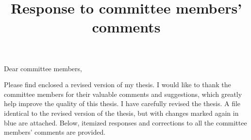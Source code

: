 \documentclass[aps,prl,reprint,showpacs,floatfix,superscriptaddress, onecolumn, 12pt]{revtex4-2}
\begin{document}

\title{Response to committee members' comments}
\author{}

\maketitle

\noindent Dear committee members,

Please find enclosed a revised version of my thesis. I would like to thank the committee members for their valuable comments and suggestions, which greatly help improve the quality of this thesis. I have carefully revised the thesis. A file identical to the revised version of the thesis, but with changes marked again in blue are attached. Below, itemized responses and corrections to all the committee members' comments are provided.
\end{document}
